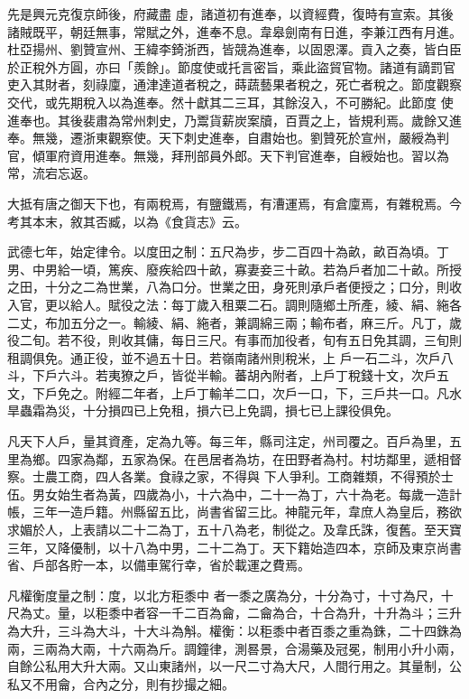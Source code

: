 \begin{pinyinscope}
 先是興元克復京師後，府藏盡
 虛，諸道初有進奉，以資經費，復時有宣索。其後諸賊既平，朝廷無事，常賦之外，進奉不息。韋皋劍南有日進，李兼江西有月進。杜亞揚州、劉贊宣州、王緯李錡浙西，皆競為進奉，以固恩澤。貢入之奏，皆白臣於正稅外方圓，亦曰「羨餘」。節度使或托言密旨，乘此盜貿官物。諸道有謫罰官吏入其財者，刻祿廩，通津達道者稅之，蒔蔬藝果者稅之，死亡者稅之。節度觀察交代，或先期稅入以為進奉。然十獻其二三耳，其餘沒入，不可勝紀。此節度
 使進奉也。其後裴肅為常州刺史，乃鬻貨薪炭案牘，百賈之上，皆規利焉。歲餘又進奉。無幾，遷浙東觀察使。天下刺史進奉，自肅始也。劉贊死於宣州，嚴綬為判官，傾軍府資用進奉。無幾，拜刑部員外郎。天下判官進奉，自綬始也。習以為常，流宕忘返。



 大抵有唐之御天下也，有兩稅焉，有鹽鐵焉，有漕運焉，有倉廩焉，有雜稅焉。今考其本末，敘其否臧，以為《食貨志》云。



 武德七年，始定律令。以度田之制：五尺為步，步二百四十為畝，畝百為頃。丁
 男、中男給一頃，篤疾、廢疾給四十畝，寡妻妾三十畝。若為戶者加二十畝。所授之田，十分之二為世業，八為口分。世業之田，身死則承戶者便授之；口分，則收入官，更以給人。賦役之法：每丁歲入租粟二石。調則隨鄉土所產，綾、絹、絁各二丈，布加五分之一。輸綾、絹、絁者，兼調綿三兩；輸布者，麻三斤。凡丁，歲役二旬。若不役，則收其傭，每日三尺。有事而加役者，旬有五日免其調，三旬則租調俱免。通正役，並不過五十日。若嶺南諸州則稅米，上
 戶一石二斗，次戶八斗，下戶六斗。若夷獠之戶，皆從半輸。蕃胡內附者，上戶丁稅錢十文，次戶五文，下戶免之。附經二年者，上戶丁輸羊二口，次戶一口，下，三戶共一口。凡水旱蟲霜為災，十分損四已上免租，損六已上免調，損七已上課役俱免。



 凡天下人戶，量其資產，定為九等。每三年，縣司注定，州司覆之。百戶為里，五里為鄉。四家為鄰，五家為保。在邑居者為坊，在田野者為村。村坊鄰里，遞相督察。士農工商，四人各業。食祿之家，不得與
 下人爭利。工商雜類，不得預於士伍。男女始生者為黃，四歲為小，十六為中，二十一為丁，六十為老。每歲一造計帳，三年一造戶籍。州縣留五比，尚書省留三比。神龍元年，韋庶人為皇后，務欲求媚於人，上表請以二十二為丁，五十八為老，制從之。及韋氏誅，復舊。至天寶三年，又降優制，以十八為中男，二十二為丁。天下籍始造四本，京師及東京尚書省、戶部各貯一本，以備車駕行幸，省於載運之費焉。



 凡權衡度量之制：度，以北方秬黍中
 者一黍之廣為分，十分為寸，十寸為尺，十尺為丈。量，以秬黍中者容一千二百為龠，二龠為合，十合為升，十升為斗；三升為大升，三斗為大斗，十大斗為斛。權衡：以秬黍中者百黍之重為銖，二十四銖為兩，三兩為大兩，十六兩為斤。調鐘律，測晷景，合湯藥及冠冕，制用小升小兩，自餘公私用大升大兩。又山東諸州，以一尺二寸為大尺，人間行用之。其量制，公私又不用龠，合內之分，則有抄撮之細。




\end{pinyinscope}
